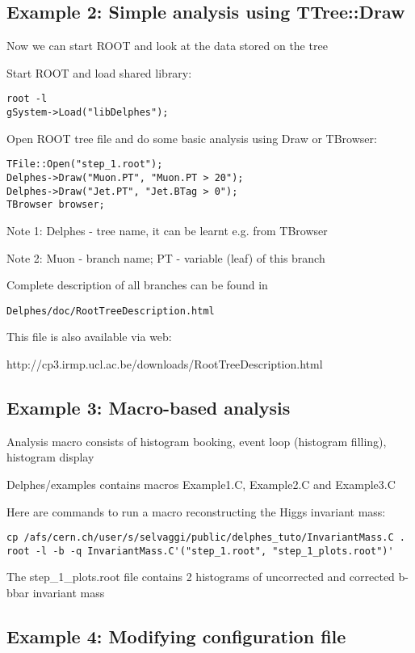 \documentclass[a4paper,10pt]{article}
\begin{document}
\subsection{Example 2: Simple analysis using TTree::Draw}

Now we can start ROOT and look at the data stored on the tree

Start ROOT and load shared library:
\begin{lstlisting}
root -l
gSystem->Load("libDelphes");
\end{lstlisting}

Open ROOT tree file and do some basic analysis using Draw or TBrowser:
\begin{lstlisting}
TFile::Open("step_1.root");
Delphes->Draw("Muon.PT", "Muon.PT > 20");
Delphes->Draw("Jet.PT", "Jet.BTag > 0");
TBrowser browser;
\end{lstlisting}

Note 1: Delphes - tree name, it can be learnt e.g. from TBrowser

Note 2: Muon - branch name; PT - variable (leaf) of this branch

Complete description of all branches can be found in
\begin{lstlisting}
Delphes/doc/RootTreeDescription.html
\end{lstlisting}

This file is also available via web:

  http://cp3.irmp.ucl.ac.be/downloads/RootTreeDescription.html


\subsection{Example 3: Macro-based analysis}

Analysis macro consists of histogram booking, event loop (histogram filling),
histogram display

Delphes/examples contains macros Example1.C, Example2.C and Example3.C

Here are commands to run a macro reconstructing the Higgs invariant mass:
\begin{lstlisting}
cp /afs/cern.ch/user/s/selvaggi/public/delphes_tuto/InvariantMass.C .
root -l -b -q InvariantMass.C'("step_1.root", "step_1_plots.root")'
\end{lstlisting}

The step\_1\_plots.root file contains 2 histograms of uncorrected and
corrected b-bbar invariant mass


\subsection{Example 4: Modifying configuration file}
\end{document}
